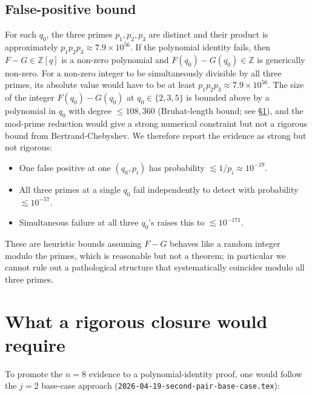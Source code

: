 \documentclass[11pt]{article}
\theoremstyle{definition}
\begin{document}
\subsection{False-positive bound}

For each $q_0$, the three primes $p_1, p_2, p_3$ are distinct and their product is approximately $p_1 p_2 p_3 \approx 7.9 \times 10^{56}$. If the polynomial identity fails, then $F - G \in \mathbb{Z}[q]$ is a non-zero polynomial and $F(q_0) - G(q_0) \in \mathbb{Z}$ is generically non-zero. For a non-zero integer to be simultaneously divisible by all three primes, its absolute value would have to be at least $p_1 p_2 p_3 \approx 7.9 \times 10^{56}$. The size of the integer $F(q_0) - G(q_0)$ at $q_0 \in \{2, 3, 5\}$ is bounded above by a polynomial in $q_0$ with degree $\leq 108{,}360$ (Bruhat-length bound; see \S\ref{sec:degree}), and the mod-prime reduction would give a strong numerical constraint but not a rigorous bound from Bertrand-Chebyshev. We therefore report the evidence as strong but not rigorous:

\begin{itemize}
\item One false positive at one $(q_0, p_i)$ has probability $\lesssim 1/p_i \approx 10^{-19}$.
\item All three primes at a single $q_0$ fail independently to detect with probability $\lesssim 10^{-57}$.
\item Simultaneous failure at all three $q_0$'s raises this to $\lesssim 10^{-171}$.
\end{itemize}
These are heuristic bounds assuming $F - G$ behaves like a random integer modulo the primes, which is reasonable but not a theorem; in particular we cannot rule out a pathological structure that systematically coincides modulo all three primes.

\section{What a rigorous closure would require}\label{sec:degree}

To promote the $n = 8$ evidence to a polynomial-identity proof, one would follow the $j=2$ base-case approach (\texttt{2026-04-19-second-pair-base-case.tex}):
\end{document}
